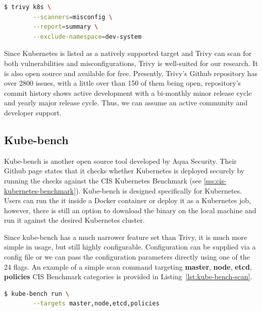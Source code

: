 \begin{center}
    \begin{lstlisting}[language=bash, caption={[An example of a Trivy Kubernetes scan command] An example of a Trivy Kubernetes scan command.}, label={lst:trivy-k8s}]
    $ trivy k8s \
        --scanners=misconfig \
        --report=summary \
        --exclude-namespace=dev-system
    \end{lstlisting}
\end{center}

Since Kubernetes is listed as a natively supported target and Trivy can scan for both vulnerabilities and misconfigurations, Trivy is well-suited for our research. It is also open source and available for free. Presently, Trivy's Github repository has over 2800 issues, with a little over than 150 of them being open, repository's commit history shows active development with a bi-monthly minor release cycle and yearly major release cycle. Thus, we can assume an active community and developer support.

\subsection{Kube-bench}
Kube-bench is another open source tool developed by Aqua Security. Their Github page \cite{kube-bench-github} states that it checks whether Kubernetes is deployed securely by running the checks against the CIS Kubernetes Benchmark (see \ref{sss:cis-kubernetes-benchmark}). Kube-bench is designed specifically for Kubernetes. Users can run the it inside a Docker container or deploy it as a Kubernetes job, however, there is still an option to download the binary on the local machine and run it against the desired Kubernetes cluster.

Since kube-bench has a much narrower feature set than Trivy, it is much more simple in usage, but still highly configurable. Configuration can be supplied via a config file or we can pass the configuration parameters directly using one of the 24 flags. An example of a simple scan command targeting \textbf{master}, \textbf{node}, \textbf{etcd}, \textbf{policies} CIS Benchmark categories is provided in Listing~\ref{lst:kube-bench-scan}.

\begin{center}
    \begin{lstlisting}[language=bash, caption={[An example of a Kube-bench scan command] An example of a Kube-bench scan command.}, label={lst:kube-bench-scan}]
    $ kube-bench run \
        --targets master,node,etcd,policies
    \end{lstlisting}
\end{center}

